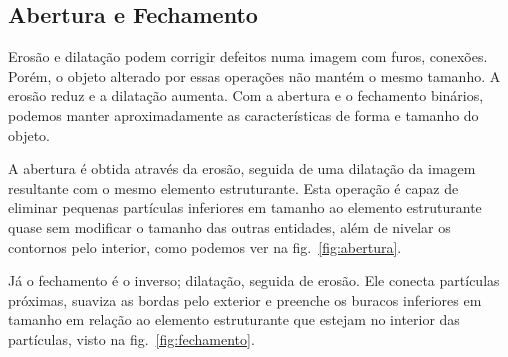 \subsection{Abertura e Fechamento}

Erosão e dilatação podem corrigir defeitos numa imagem com furos, conexões. Porém, o objeto alterado por essas operações não mantém o mesmo tamanho. A erosão reduz e a dilatação aumenta. Com a abertura e o fechamento binários, podemos manter aproximadamente as características de forma e tamanho do objeto.

A abertura é obtida através da erosão, seguida de uma dilatação da imagem resultante com o mesmo elemento estruturante. Esta operação é capaz de eliminar pequenas partículas inferiores em tamanho ao elemento estruturante quase sem modificar o tamanho das outras entidades, além de nivelar os contornos pelo interior, como podemos ver na fig.~\ref{fig:abertura}.

Já o fechamento é o inverso; dilatação, seguida de erosão. Ele conecta partículas próximas, suaviza as bordas pelo exterior e preenche os buracos inferiores em tamanho em relação ao elemento estruturante que estejam no interior das partículas, visto na fig.~\ref{fig:fechamento}.

